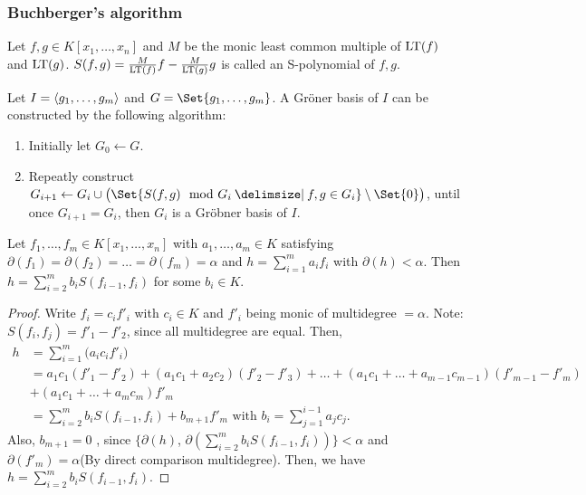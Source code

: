 \subsubsection{Buchberger's algorithm}

\begin{definition}
  Let $f,g \in K[x_1,\dots,x_n]$ and $M$ be the monic least common multiple of
  $\operatorname{LT}(f)$ and $\operatorname{LT}(g)$. $S(f,g) = \frac{M}{\operatorname{LT}(f)}f - \frac{M}{\operatorname{LT}(g)}g$ is
  called an S-polynomial of $f, g$.
\end{definition}

Let $I = \langle g_1, \dots, g_m \rangle$ and $G = \Set{ g_1, \dots, g_m }$.
A Gr\"{o}ner basis of $I$ can be constructed by the following algorithm:
\begin{enumerate}
  \item Initially let $G_0 \gets G$.
  \item Repeatly construct $G_{i+1} \gets G_i \cup \big(
    \Set{S(f, g) \mod G_i \given f, g \in G_i} \setminus \Set{0} \big)$,
    until once $G_{i+1} = G_i$, then $G_i$ is a Gr\"{o}bner basis of $I$.
\end{enumerate}

\begin{lemma} \label{lemma:sum-of-equal-degree-f-is-less}
  Let $f_1, \dots, f_m \in K[x_1, \dots, x_n]$ with $a_1, \dots, a_m \in K$
  satisfying $\partial(f_1) = \partial(f_2) = \dots = \partial(f_m) = \alpha$
  and $h =\sum_{i = 1}^m a_i f_i $ with $\partial(h) < \alpha$.
  Then $h = \sum_{i = 2}^m b_i S(f_{i-1}, f_i)$ for some $b_i \in K$.
  \begin{proof}
    Write $f_i = c_if'_i$ with $c_i \in K$ and $f'_i$ being monic of multidegree
    $= \alpha$. Note: $S(f_i, f_j) = f'_1 - f'_2$, since all multidegree 
  are equal. Then,
    \[
      \begin{split}
        h &= \sum_{i=1}^m \big( a_ic_if'_i \big) \\
        &= a_1c_1(f'_1-f'_2) + (a_1c_1+a_2c_2)(f'_2-f'_3) + \dots+ (a_1c_1 + \dots + a_{m-1}c_{m-1})(f'_{m-1}-f'_m) \\
        &+ (a_1c_1+\dots+a_mc_m)f'_m \\
        &= \sum\limits_{i=2}^m b_iS(f_{i-1},f_i) + b_{m+1}f'_m\text{ with }
        b_i = \sum_{j=1}^{i-1}a_jc_j.
      \end{split}
    \]
    Also, $b_{m+1} = 0$ , since $\Big\{\partial(h)$,
    $\partial\left(\sum\limits_{i=2}^m b_iS(f_{i-1},f_i) \right) \Big\} < \alpha$ and
    $\partial(f'_m) = \alpha$(By direct comparison multidegree). Then, we have 
  $h = \sum_{i = 2}^m b_i S(f_{i-1}, f_i)$.
  \end{proof}
\end{lemma}

